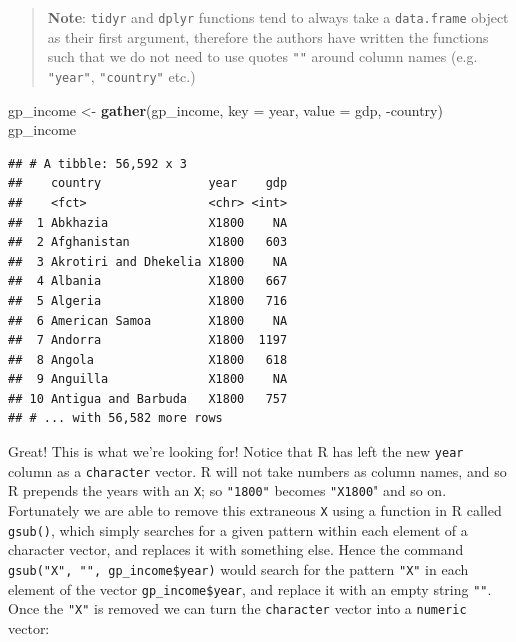 \documentclass[]{book}
\newenvironment{Shaded}{\begin{snugshade}}{\end{snugshade}}
\newcommand{\KeywordTok}[1]{\textcolor[rgb]{0.13,0.29,0.53}{\textbf{{#1}}}}
\newcommand{\DataTypeTok}[1]{\textcolor[rgb]{0.13,0.29,0.53}{{#1}}}
\newcommand{\StringTok}[1]{\textcolor[rgb]{0.31,0.60,0.02}{{#1}}}
\newcommand{\NormalTok}[1]{{#1}}
\theoremstyle{definition}
\theoremstyle{definition}
\theoremstyle{definition}
\theoremstyle{remark}
\begin{document}
\begin{quote}
\textbf{Note}: \texttt{tidyr} and \texttt{dplyr} functions tend to
always take a \texttt{data.frame} object as their first argument,
therefore the authors have written the functions such that we do not
need to use quotes \texttt{""} around column names (e.g.
\texttt{"year"}, \texttt{"country"} etc.)
\end{quote}

\begin{Shaded}
\begin{Highlighting}[]
\NormalTok{gp_income <-}\StringTok{ }\KeywordTok{gather}\NormalTok{(gp_income, }\DataTypeTok{key =} \NormalTok{year, }\DataTypeTok{value =} \NormalTok{gdp, -country)}
\NormalTok{gp_income}
\end{Highlighting}
\end{Shaded}

\begin{verbatim}
## # A tibble: 56,592 x 3
##    country               year    gdp
##    <fct>                 <chr> <int>
##  1 Abkhazia              X1800    NA
##  2 Afghanistan           X1800   603
##  3 Akrotiri and Dhekelia X1800    NA
##  4 Albania               X1800   667
##  5 Algeria               X1800   716
##  6 American Samoa        X1800    NA
##  7 Andorra               X1800  1197
##  8 Angola                X1800   618
##  9 Anguilla              X1800    NA
## 10 Antigua and Barbuda   X1800   757
## # ... with 56,582 more rows
\end{verbatim}

Great! This is what we're looking for! Notice that R has left the new
\texttt{year} column as a \texttt{character} vector. R will not take
numbers as column names, and so R prepends the years with an \texttt{X};
so \texttt{"1800"} becomes \texttt{"X1800}" and so on. Fortunately we
are able to remove this extraneous \texttt{X} using a function in R
called \texttt{gsub()}, which simply searches for a given pattern within
each element of a character vector, and replaces it with something else.
Hence the command \texttt{gsub("X",\ "",\ gp\_income\$year)} would
search for the pattern \texttt{"X"} in each element of the vector
\texttt{gp\_income\$year}, and replace it with an empty string
\texttt{""}. Once the \texttt{"X"} is removed we can turn the
\texttt{character} vector into a \texttt{numeric} vector:

\begin{Shaded}
\end{Shaded}
\end{document}

